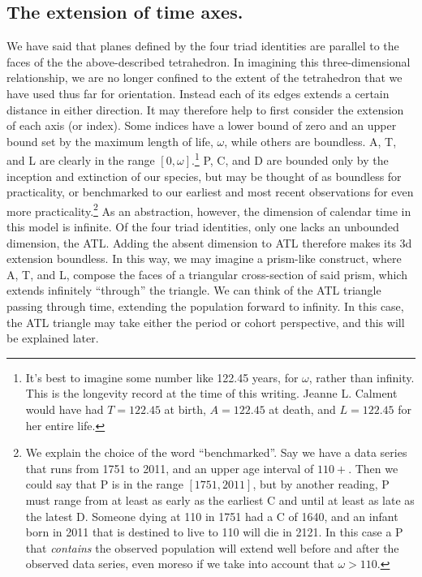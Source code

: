 \documentclass[11pt,oneside,a4paper]{article} %
\begin{document}
\subsection*{The extension of time axes.}
We have said that planes defined by the four triad identities are parallel to
the faces of the the above-described tetrahedron. In imagining this three-dimensional
relationship, we are no longer confined to the extent of the tetrahedron that
we have used thus far for orientation. Instead each of its edges extends a
certain distance in either direction.
It may therefore help to first consider the extension of each axis (or index).
Some indices have a lower bound of zero and an upper bound set by the maximum
length of life, $\omega$, while others are boundless. A, T, and L
are clearly in the range $[0,\omega]$.\footnote{It's best to imagine some number like 122.45 years, for $\omega$, rather than infinity. This is the longevity record at the time of this writing. Jeanne L. Calment would have had
$T=122.45$ at birth, $A = 122.45$ at death, and $L=122.45$ for
her entire life.} P, C, and D are bounded only by the inception and extinction of
our species, but may be thought of as boundless for practicality, or benchmarked
to our earliest and most recent observations for even more
practicality.\footnote{We explain the choice of the word ``benchmarked''. Say
we have a data series that runs from 1751 to 2011, and an upper age
interval of $110+$. Then we could say that P is in the range $[1751,2011]$,
but by another reading, P must range from at least as early as the earliest
C and until at least as late as the latest D. Someone dying at 110 in 1751
had a C of 1640, and an infant born in 2011 that is destined to live to 110
will die in 2121. In this case a P that \textit{contains} the observed
population will extend well before and after the observed data series, even
moreso if we take into account that $\omega > 110$.} As an abstraction,
however, the dimension of calendar time in this model is infinite. Of the four
triad identities, only one lacks an unbounded dimension, the ATL. Adding
the absent dimension to ATL therefore makes its 3d extension boundless. In
this way, we may imagine a prism-like construct, where A, T, and L, compose
the faces of a triangular cross-section of said prism, which extends infinitely ``through'' the triangle.
We can think of the ATL triangle passing through time, extending the population
forward to infinity. In this case, the ATL triangle may take either the period
or cohort perspective, and this will be explained later. 
\end{document}
